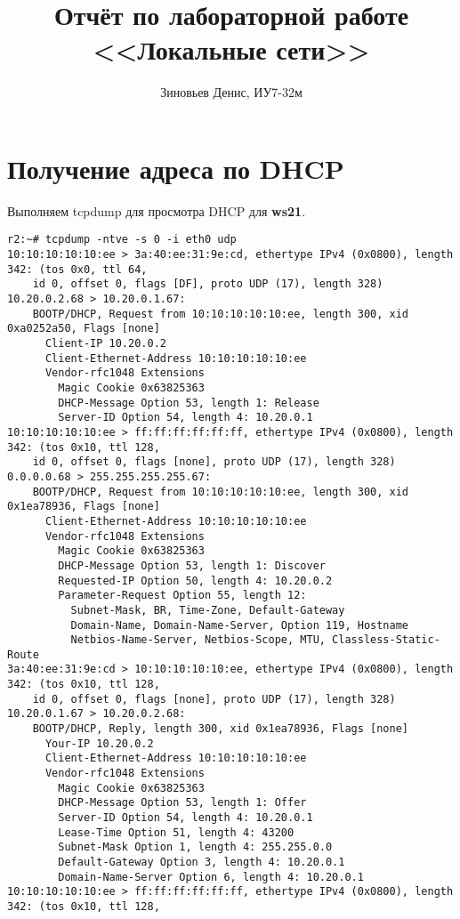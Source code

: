 \documentclass[a4paper,12pt]{article}
\title{Отчёт по лабораторной работе \\ <<Локальные сети>>}
\author{Зиновьев Денис, ИУ7-32м}
\begin{document}
\maketitle

\tableofcontents

\section{Получение адреса по DHCP}

Выполняем tcpdump для просмотра DHCP для \textbf{ws21}.

\begin{Verbatim}
r2:~# tcpdump -ntve -s 0 -i eth0 udp
10:10:10:10:10:ee > 3a:40:ee:31:9e:cd, ethertype IPv4 (0x0800), length 342: (tos 0x0, ttl 64,
	id 0, offset 0, flags [DF], proto UDP (17), length 328) 10.20.0.2.68 > 10.20.0.1.67:
	BOOTP/DHCP, Request from 10:10:10:10:10:ee, length 300, xid 0xa0252a50, Flags [none]
	  Client-IP 10.20.0.2
	  Client-Ethernet-Address 10:10:10:10:10:ee
	  Vendor-rfc1048 Extensions
	    Magic Cookie 0x63825363
	    DHCP-Message Option 53, length 1: Release
	    Server-ID Option 54, length 4: 10.20.0.1
10:10:10:10:10:ee > ff:ff:ff:ff:ff:ff, ethertype IPv4 (0x0800), length 342: (tos 0x10, ttl 128,
	id 0, offset 0, flags [none], proto UDP (17), length 328) 0.0.0.0.68 > 255.255.255.255.67:
	BOOTP/DHCP, Request from 10:10:10:10:10:ee, length 300, xid 0x1ea78936, Flags [none]
	  Client-Ethernet-Address 10:10:10:10:10:ee
	  Vendor-rfc1048 Extensions
	    Magic Cookie 0x63825363
	    DHCP-Message Option 53, length 1: Discover
	    Requested-IP Option 50, length 4: 10.20.0.2
	    Parameter-Request Option 55, length 12:
	      Subnet-Mask, BR, Time-Zone, Default-Gateway
	      Domain-Name, Domain-Name-Server, Option 119, Hostname
	      Netbios-Name-Server, Netbios-Scope, MTU, Classless-Static-Route
3a:40:ee:31:9e:cd > 10:10:10:10:10:ee, ethertype IPv4 (0x0800), length 342: (tos 0x10, ttl 128,
	id 0, offset 0, flags [none], proto UDP (17), length 328) 10.20.0.1.67 > 10.20.0.2.68:
	BOOTP/DHCP, Reply, length 300, xid 0x1ea78936, Flags [none]
	  Your-IP 10.20.0.2
	  Client-Ethernet-Address 10:10:10:10:10:ee
	  Vendor-rfc1048 Extensions
	    Magic Cookie 0x63825363
	    DHCP-Message Option 53, length 1: Offer
	    Server-ID Option 54, length 4: 10.20.0.1
	    Lease-Time Option 51, length 4: 43200
	    Subnet-Mask Option 1, length 4: 255.255.0.0
	    Default-Gateway Option 3, length 4: 10.20.0.1
	    Domain-Name-Server Option 6, length 4: 10.20.0.1
10:10:10:10:10:ee > ff:ff:ff:ff:ff:ff, ethertype IPv4 (0x0800), length 342: (tos 0x10, ttl 128,

\end{Verbatim}
\end{document}
